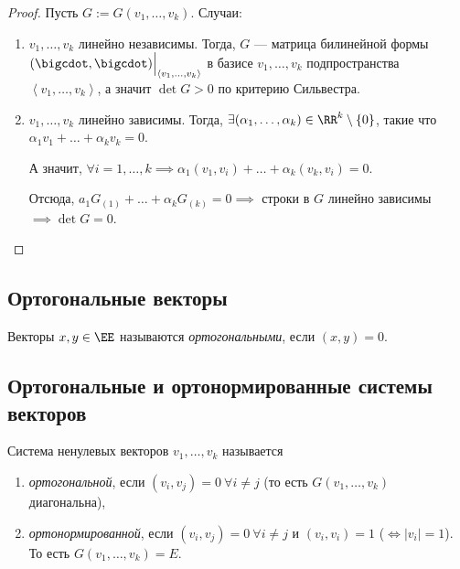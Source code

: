 \begin{proof}
    Пусть $G := G(v_1, \dots, v_k)$.
    Случаи:
    \begin{enumerate}
    \item $v_1, \dots, v_k$ линейно независимы. Тогда, $G$ --- матрица билинейной формы $(\bigcdot, \bigcdot) \Big|_{\left< v_1, \dots, v_k \right>}$ в базисе $v_1, \dots, v_k$ подпространства $\left< v_1, \dots, v_k \right>$, а значит $\det G > 0$ по критерию Сильвестра.
    
    \item $v_1, \dots, v_k$ линейно зависимы. Тогда, $\exists (\alpha_1, \dots, \alpha_k) \in \RR^k \setminus \{0\}$, такие что $\alpha_1 v_1 + \dots + \alpha_k v_k = 0$.

        А значит,  $\forall i = 1, \dots, k \implies \alpha_1 (v_1, v_i) + \dots + \alpha_k (v_k, v_i) = 0$.
        
        Отсюда, $a_1 G_{(1)} + \dots + \alpha_k G_{(k)} = 0 \implies$ строки в $G$ линейно зависимы $\implies \det G = 0$.
        \qedhere
    \end{enumerate}
\end{proof}


\subsection{Ортогональные векторы}

\begin{definition}
    Векторы $x, y \in \EE$ называются \textit{ортогональными}, если $(x, y) = 0$.
\end{definition}


\subsection{Ортогональные и ортонормированные системы векторов}

\begin{definition}
    Система ненулевых векторов $v_1, \dots, v_k$ называется
    \begin{enumerate}[nosep]
        \item \textit{ортогональной}, если $(v_i, v_j) = 0 \ \forall i \neq j$ (то есть $G(v_1, \dots, v_k)$ диагональна),
        \item \textit{ортонормированной}, если $(v_i, v_j) = 0 \ \forall i \neq j$ и $(v_i, v_i) = 1$ ($\iff |v_i| = 1$).
            То есть $G(v_1, \dots, v_k) = E$.
    \end{enumerate}
\end{definition}

